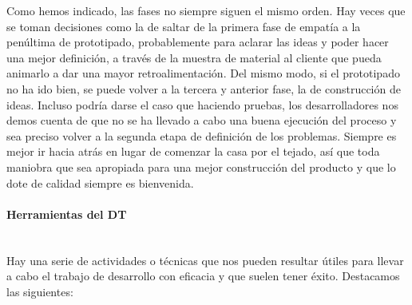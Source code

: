 Como hemos indicado, las fases no siempre siguen el mismo orden. Hay veces que se toman decisiones como la de saltar de la primera fase de empatía a la penúltima de prototipado, probablemente para aclarar las ideas y poder hacer una mejor definición, a través de la muestra de material al cliente que pueda animarlo a dar una mayor retroalimentación. Del mismo modo, si el prototipado no ha ido bien, se puede volver a la tercera y anterior fase, la de construcción de ideas. Incluso podría darse el caso que haciendo pruebas, los desarrolladores nos demos cuenta de que no se ha llevado a cabo una buena ejecución del proceso y sea preciso volver a la segunda etapa de definición de los problemas. Siempre es mejor ir hacia atrás en lugar de comenzar la casa por el tejado, así que toda maniobra que sea apropiada para una mejor construcción del producto y que lo dote de calidad siempre es bienvenida.


\paragraph{Herramientas del DT}
\label{herramientasDT}
\leavevmode\\[\baselineskip]

Hay una serie de actividades o técnicas que nos pueden resultar útiles para llevar a cabo el trabajo de desarrollo con eficacia y que suelen tener éxito. Destacamos las siguientes:

